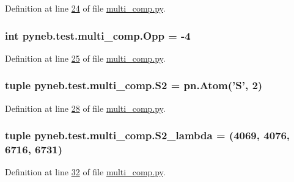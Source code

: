 Definition at line \hyperlink{multi__comp_8py_source_l00024}{24} of file \hyperlink{multi__comp_8py_source}{multi\-\_\-comp.\-py}.

\hypertarget{namespacepyneb_1_1test_1_1multi__comp_abd16a9dd120d958a9edbf2ec1322c026}{
\subsubsection[{Opp}]{\setlength{\rightskip}{0pt plus 5cm}int pyneb.\-test.\-multi\-\_\-comp.\-Opp = -\/4}}\label{namespacepyneb_1_1test_1_1multi__comp_abd16a9dd120d958a9edbf2ec1322c026}


Definition at line \hyperlink{multi__comp_8py_source_l00025}{25} of file \hyperlink{multi__comp_8py_source}{multi\-\_\-comp.\-py}.

\hypertarget{namespacepyneb_1_1test_1_1multi__comp_a8d90734f103bcd80bced4c908bfeb493}{
\subsubsection[{S2}]{\setlength{\rightskip}{0pt plus 5cm}tuple pyneb.\-test.\-multi\-\_\-comp.\-S2 = pn.\-Atom('S', 2)}}\label{namespacepyneb_1_1test_1_1multi__comp_a8d90734f103bcd80bced4c908bfeb493}


Definition at line \hyperlink{multi__comp_8py_source_l00028}{28} of file \hyperlink{multi__comp_8py_source}{multi\-\_\-comp.\-py}.

\hypertarget{namespacepyneb_1_1test_1_1multi__comp_aac760bd0cfecb07df5afa64ec3f82947}{
\subsubsection[{S2\-\_\-lambda}]{\setlength{\rightskip}{0pt plus 5cm}tuple pyneb.\-test.\-multi\-\_\-comp.\-S2\-\_\-lambda = (4069, 4076, 6716, 6731)}}\label{namespacepyneb_1_1test_1_1multi__comp_aac760bd0cfecb07df5afa64ec3f82947}


Definition at line \hyperlink{multi__comp_8py_source_l00032}{32} of file \hyperlink{multi__comp_8py_source}{multi\-\_\-comp.\-py}.

